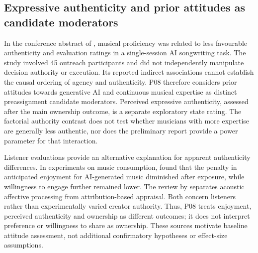 \documentclass[11pt]{article}
\begin{document}
\subsection{Expressive authenticity and prior attitudes as candidate moderators}
In the conference abstract of \citet{swarbrick2026}, musical proficiency was related to less favourable authenticity and evaluation ratings in a single-session AI songwriting task. The study involved 45 outreach participants and did not independently manipulate decision authority or execution. Its reported indirect associations cannot establish the causal ordering of agency and authenticity. P08 therefore considers prior attitudes towards generative AI and continuous musical expertise as distinct preassignment candidate moderators. Perceived expressive authenticity, assessed after the main ownership outcome, is a separate exploratory state rating. The factorial authority contrast does not test whether musicians with more expertise are generally less authentic, nor does the preliminary report provide a power parameter for that interaction.

Listener evaluations provide an alternative explanation for apparent authenticity differences. In experiments on music consumption, \citet{edelblum2026} found that the penalty in anticipated enjoyment for AI-generated music diminished after exposure, while willingness to engage further remained lower. The review by \citet{hesun2026} separates acoustic affective processing from attribution-based appraisal. Both concern listeners rather than experimentally varied creator authority. Thus, P08 treats enjoyment, perceived authenticity and ownership as different outcomes; it does not interpret preference or willingness to share as ownership. These sources motivate baseline attitude assessment, not additional confirmatory hypotheses or effect-size assumptions.
\end{document}
